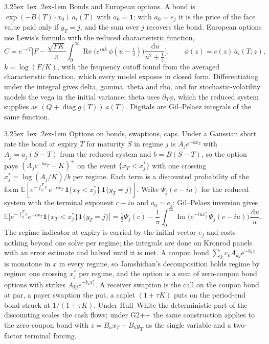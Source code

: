 \documentclass[11pt]{article}
\makeatletter
\renewcommand\paragraph{\@startsection{paragraph}{4}{\z@}%
  {3.25ex \@plus1ex \@minus.2ex}{-1em}%
  {\normalfont\normalsize\itshape}}
\theoremstyle{remark}
\newcommand{\E}{\mathbb{E}}
\newcommand{\dd}{\,\mathrm{d}}
\newcommand{\diag}{\operatorname{diag}}
\makeatother
\begin{document}
\paragraph{Bonds and European options.} A bond is $\exp(-B(T)\cdot x_0)\,a_i(T)$ with $a_0 = \mathbf 1$; with
$a_0 = e_j$ it is the price of the face value paid only if $y_T = j$, and the sum over $j$ recovers the bond.
European options use Lewis's formula \citep{lewis2001} with the reduced characteristic function,
\begin{equation}
  C = e^{-rT}\Big[F - \frac{\sqrt{FK}}{\pi}\int_0^\infty \operatorname{Re}\big(e^{iuk}\,\phi(u - \tfrac i2)\big)\frac{\dd u}{u^2 + \tfrac14}\Big],
  \qquad \phi(z) = c(z)\,a_i(T;z),
  \label{eq:lewis}
\end{equation}
$k = \log(F/K)$, with the frequency cutoff found from the averaged characteristic function, which every model
exposes in closed form. Differentiating under the integral gives delta, gamma, theta and rho, and for
stochastic-volatility models the vega in the initial variance; theta uses $\partial_T\phi$, which the reduced
system supplies as $(Q + \diag g(T))\,a(T)$. Digitals are Gil--Pelaez integrals of the same function.

\paragraph{Options on bonds, swaptions, caps.}
Under a Gaussian short rate the bond at expiry $T$ for maturity $S$ in regime $j$ is $A_j e^{-b x_T}$ with
$A_j = a_j(S - T)$ from the reduced system and $b = B(S - T)$, so the option pays $(A_j e^{-bx_T} - K)^+$ on the
event $\{x_T < x^*_j\}$ with one crossing $x^*_j = \log(A_j/K)/b$ per regime. Each term is a discounted
probability of the form $\E[e^{-\int_0^T r}\,e^{-c x_T}\,\mathbf 1\{x_T < x^*_j\}\,\mathbf 1\{y_T = j\}]$. Write
$\Psi_j(c - iu)$ for the reduced system with the terminal exponent $c - iu$ and $a_0 = e_j$; Gil--Pelaez inversion
gives
\begin{equation}
  \E\big[e^{-\int_0^T r} e^{-cx_T}\mathbf 1\{x_T < x^*_j\}\mathbf 1\{y_T = j\}\big]
  = \tfrac12\Psi_j(c) - \frac1\pi\int_0^\infty \operatorname{Im}\big(e^{-iux^*_j}\,\Psi_j(c - iu)\big)\frac{\dd u}{u}.
  \label{eq:gilpelaez}
\end{equation}
The regime indicator at expiry is carried by the initial vector $e_j$ and costs nothing beyond one solve per
regime; the integrals are done on Kronrod panels with an error estimate and halved until it is met.
A coupon bond $\sum_k c_k A_{kj}e^{-b_k x}$ is monotone in $x$ in every regime, so Jamshidian's decomposition
\citep{jamshidian1989} holds regime by regime: one crossing $x^*_j$ per regime, and the option is a sum of
zero-coupon bond options with strikes $A_{kj}e^{-b_k x^*_j}$. A receiver swaption is the call on the coupon bond
at par, a payer swaption the put, a caplet $(1 + \tau K)$ puts on the period-end bond struck at $1/(1 + \tau K)$.
Under Hull--White the deterministic part of the discounting scales the cash flows; under G2++ the same
construction applies to the zero-coupon bond with $z = B_a x_T + B_b y_T$ as the single variable and a
two-factor terminal forcing.
\end{document}
